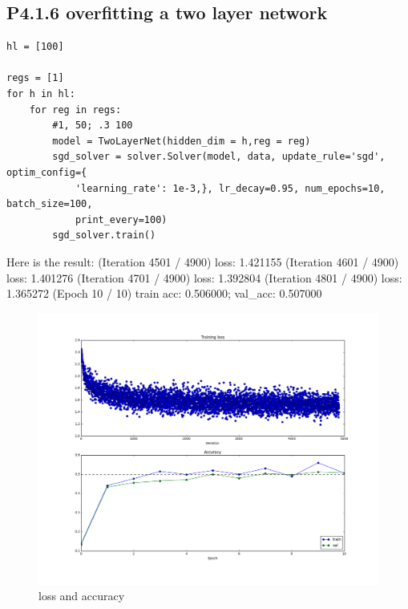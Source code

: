 \documentclass[12pt]{article}
\begin{document}
\subsection*{P4.1.6 overfitting a two layer network}
\begin{lstlisting}
hl = [100]

regs = [1]
for h in hl:
    for reg in regs:
        #1, 50; .3 100
        model = TwoLayerNet(hidden_dim = h,reg = reg)
        sgd_solver = solver.Solver(model, data, update_rule='sgd', optim_config={
            'learning_rate': 1e-3,}, lr_decay=0.95, num_epochs=10, batch_size=100, 
            print_every=100)
        sgd_solver.train()
\end{lstlisting}
Here is the result:
(Iteration 4501 / 4900) loss: 1.421155
(Iteration 4601 / 4900) loss: 1.401276
(Iteration 4701 / 4900) loss: 1.392804
(Iteration 4801 / 4900) loss: 1.365272
(Epoch 10 / 10) train acc: 0.506000; val\_acc: 0.507000
\begin{figure}[H]
  \caption{loss and accuracy}
  \centering
    \includegraphics[scale=0.5]{lossandacc.png}
\end{figure}
\end{document}
